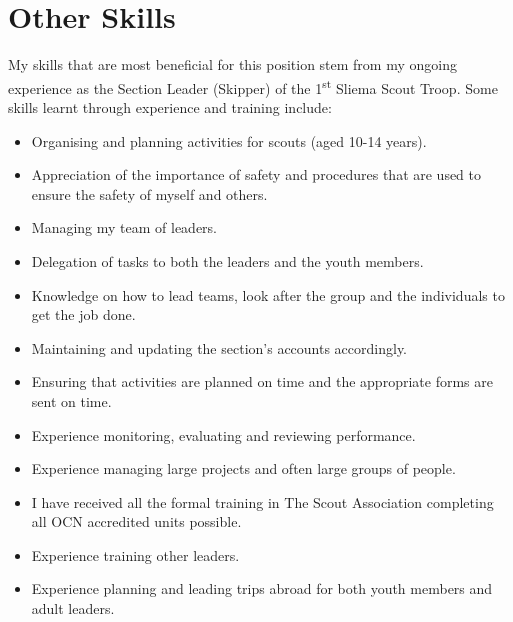 \documentclass[10pt]{article}
\begin{document}
	\section*{Other Skills}
	My skills that are most beneficial for this position stem from my ongoing experience as the Section Leader (Skipper) of the 1\textsuperscript{st} Sliema Scout Troop. Some skills learnt through experience and training include:
	\begin{itemize}
		\renewcommand\labelitemi{-$>$}
		\item Organising and planning activities for scouts (aged 10-14 years).
		\item Appreciation of the importance of safety and procedures that are used to ensure the safety of myself and others.
		\item Managing my team of leaders.
		\item Delegation of tasks to both the leaders and the youth members.
		\item Knowledge on how to lead teams, look after the group and the individuals to get the job done.
		\item Maintaining and updating the section's accounts accordingly. 
		\item Ensuring that activities are planned on time and the appropriate forms are sent on time.
		\item Experience monitoring, evaluating and reviewing performance.
		\item Experience managing large projects and often large groups of people.
		\item I have received all the formal training in The Scout Association completing all OCN accredited units possible.
		\item Experience training other leaders.
		\item Experience planning and leading trips abroad for both youth members and adult leaders.
	\end{itemize}
	
\end{document}

